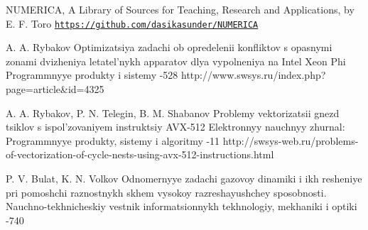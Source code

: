 \documentclass[utf8,english]{psta}%
\begin{document}
\begin{thebibliography}{30}
\finalinfo NUMERICA, A Library of Sources for Teaching, Research and Applications, by E. F. Toro
\href{https://github.com/dasikasunder/NUMERICA}{{\tt https://github.com/dasikasunder/NUMERICA}}

\by A. A. Rybakov
\paper Optimizatsiya zadachi ob opredelenii konfliktov s opasnymi zonami dvizheniya letatel'nykh apparatov dlya vypolneniya na Intel Xeon Phi
\jour Programmnyye produkty i sistemy
-528
\URL http://www.swsys.ru/index.php?page=article&id=4325

\by A. A. Rybakov, P. N. Telegin, B. M. Shabanov
\paper Problemy vektorizatsii gnezd tsiklov s ispol'zovaniyem instruktsiy AVX-512
\jour Elektronnyy nauchnyy zhurnal: Programmnyye produkty, sistemy i algoritmy
-11
\URL http://swsys-web.ru/problems-of-vectorization-of-cycle-nests-using-avx-512-instructions.html

\by P. V. Bulat, K. N. Volkov
\paper Odnomernyye zadachi gazovoy dinamiki i ikh resheniye pri pomoshchi raznostnykh skhem vysokoy razreshayushchey sposobnosti.
\jour Nauchno-tekhnicheskiy vestnik informatsionnykh tekhnologiy, mekhaniki i optiki
-740

\end{thebibliography}
\end{document}
